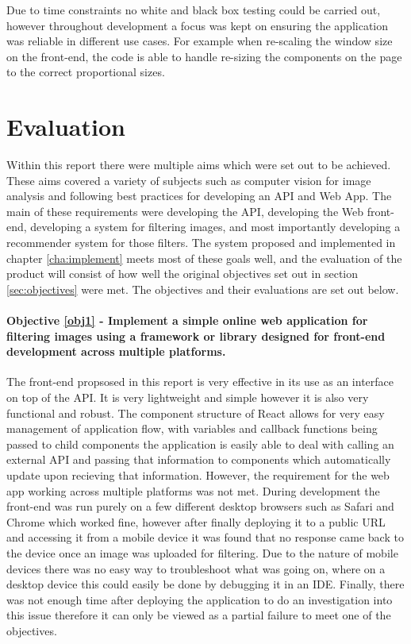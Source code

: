 \documentclass[a4paper,12pt]{report}
\begin{document}
    Due to time constraints no white and black box testing could be carried out, however throughout development a focus was kept on ensuring the application was reliable in different use cases. For example when re-scaling the window size on the front-end, the code is able to handle re-sizing the components on the page to the correct proportional sizes.

\chapter{Evaluation}
  Within this report there were multiple aims which were set out to be achieved. These aims covered a variety of subjects such as computer vision for image analysis and following best practices for developing an API and Web App. The main of these requirements were developing the API, developing the Web front-end, developing a system for filtering images, and most importantly developing a recommender system for those filters. The system proposed and implemented in chapter \ref{cha:implement} meets most of these goals well, and the evaluation of the product will consist of how well the original objectives set out in section \ref{sec:objectives} were met. The objectives and their evaluations are set out below.

  \newpage
  \subsubsection{Objective \ref{obj1} - Implement a simple online web application for filtering images using a framework or library designed for front-end development across multiple platforms.}
    The front-end propsosed in this report is very effective in its use as an interface on top of the API. It is very lightweight and simple however it is also very functional and robust. The component structure of React allows for very easy management of application flow, with variables and callback functions being passed to child components the application is easily able to deal with calling an external API and passing that information to components which automatically update upon recieving that information. However, the requirement for the web app working across multiple platforms was not met. During development the front-end was run purely on a few different desktop browsers such as Safari and Chrome which worked fine, however after finally deploying it to a public URL and accessing it from a mobile device it was found that no response came back to the device once an image was uploaded for filtering. Due to the nature of mobile devices there was no easy way to troubleshoot what was going on, where on a desktop device this could easily be done by debugging it in an IDE. Finally, there was not enough time after deploying the application to do an investigation into this issue therefore it can only be viewed as a partial failure to meet one of the objectives.
\end{document}
